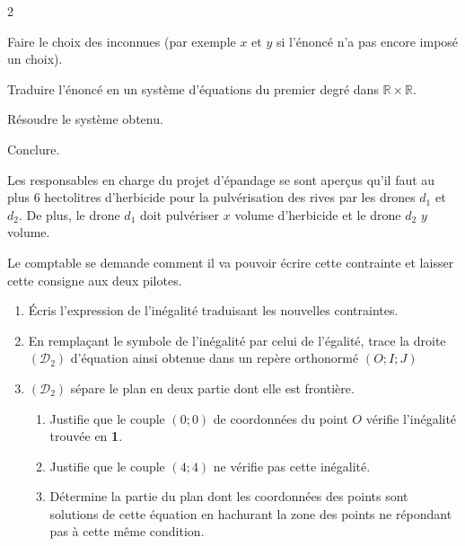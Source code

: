 \begin{multicols*}{2}
{  		 Faire le choix des inconnues (par exemple $x$ et $y$ si l'énoncé n'a pas encore imposé un choix).
  		
  		 Traduire l'énoncé en un système d'équations du premier degré dans $\mathbb{R}\times \mathbb{R}$.
  		
  		 Résoudre le système obtenu.
  		
  		 Conclure.
  		
  	}
  	
  	
  	Les responsables en charge du projet d'épandage se sont aperçus qu'il faut au plus $6$ hectolitres d'herbicide pour la pulvérisation des rives par les drones $d_{1}$ et $d_{2}$. 
  	De plus, le drone $d_{1}$ doit pulvériser $x$ volume d'herbicide et le drone $d_{2}$ $y$ volume. 
  	
  	Le comptable se demande comment il va pouvoir écrire cette contrainte et laisser cette consigne aux deux pilotes.
  	
  	
  	\begin{enumerate}
  		\item Écris l'expression de l'inégalité traduisant les nouvelles contraintes.
  		\item En remplaçant le symbole de l'inégalité par celui de l'égalité, trace la droite $(\mathcal{D}_{2})$ d'équation ainsi obtenue dans un repère orthonormé $\left(O; I;J\right)$
  		\item $(\mathcal{D}_{2})$ sépare le plan en deux partie dont elle est frontière.
  		\begin{enumerate}
  			\item Justifie que le couple $(0;0)$ de coordonnées du point $O$ vérifie l'inégalité trouvée en \textbf{1}.
  			\item Justifie que le couple $(4;4)$ ne vérifie pas  cette inégalité.
  			\item Détermine la partie du plan dont les coordonnées des points sont solutions de cette équation en hachurant la zone des points ne répondant pas à cette même condition. 
  		\end{enumerate} 
  	\end{enumerate}
  	\dures
  	
  	 
  	
\end{multicols*}
